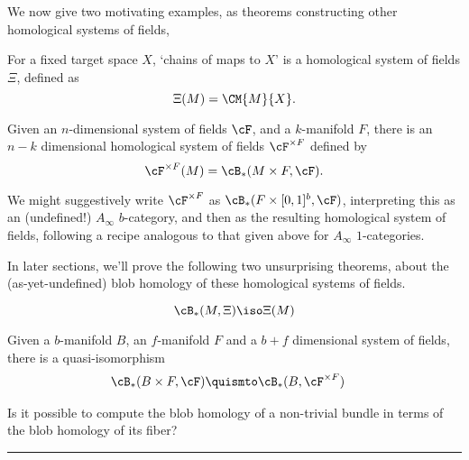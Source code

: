 We now give two motivating examples, as theorems constructing other homological systems of fields,


\begin{thm}
For a fixed target space $X$, `chains of maps to $X$' is a homological system of fields $\Xi$, defined as
\begin{equation*}
\Xi(M) = \CM{M}{X}.
\end{equation*}
\end{thm}

\begin{thm}
Given an $n$-dimensional system of fields $\cF$, and a $k$-manifold $F$, there is an $n-k$ dimensional homological system of fields $\cF^{\times F}$ defined by
\begin{equation*}
\cF^{\times F}(M) = \cB_*(M \times F, \cF).
\end{equation*}
\end{thm}
We might suggestively write $\cF^{\times F}$ as  $\cB_*(F \times [0,1]^b, \cF)$, interpreting this as an (undefined!) $A_\infty$ $b$-category, and then as the resulting homological system of fields, following a recipe analogous to that given above for $A_\infty$ $1$-categories.


In later sections, we'll prove the following two unsurprising theorems, about the (as-yet-undefined) blob homology of these homological systems of fields.


\begin{thm}
\begin{equation*}
\cB_*(M, \Xi) \iso \Xi(M)
\end{equation*}
\end{thm}

\begin{thm}
Given a $b$-manifold $B$, an $f$-manifold $F$ and a $b+f$ dimensional system of fields,
there is a quasi-isomorphism
\begin{align*}
\cB_*(B \times F, \cF) & \quismto \cB_*(B, \cF^{\times F})
\end{align*}
\end{thm}

\begin{question}
Is it possible to compute the blob homology of a non-trivial bundle in terms of the blob homology of its fiber?
\end{question}

\hrule
